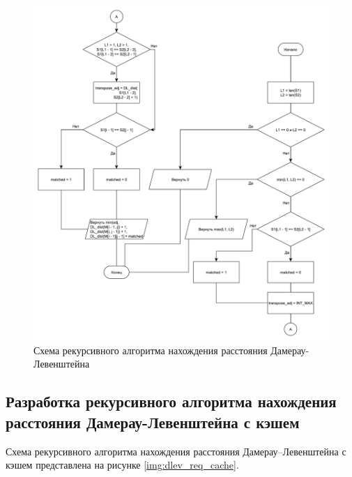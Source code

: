 \begin{figure}[h]
	\centering
	\includegraphics[scale=0.45]{images/dlev_req.pdf}
	\caption{Схема рекурсивного алгоритма нахождения расстояния Дамерау-Левенштейна}
	\label{img:dlev_req}
\end{figure}


\subsection{Разработка рекурсивного алгоритма нахождения расстояния Дамерау-Левенштейна с кэшем}

Схема рекурсивного алгоритма нахождения расстояния Дамерау--Левенштейна с кэшем представлена на рисунке \ref{img:dlev_req_cache}.


